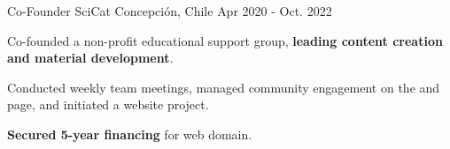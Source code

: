 \begin{cventries}
  \cventry
    {Co-Founder}
    {SciCat}
    {Concepción, Chile}
    {Apr 2020 - Oct. 2022}
    {
      \begin{cvitems}
        \item{Co-founded a non-profit educational support group, \textbf{leading content creation and material development}.}
        \item{Conducted weekly team meetings, managed community engagement on the  and  page, and initiated a website project.}
        \item{\textbf{Secured 5-year financing} for web domain.}
      \end{cvitems}
      \vspace{1em}
    }

\end{cventries}

